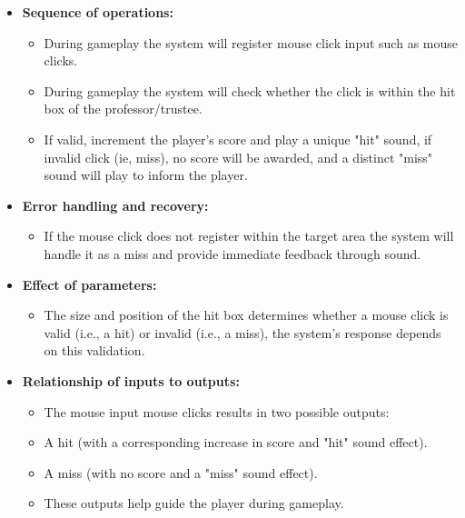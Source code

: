 \documentclass{article}
\begin{document}
\begin{itemize}
    \item \textbf{Sequence of operations:}
        \begin{itemize}
            \item During gameplay the system will register mouse click input such as mouse clicks.
            \item During gameplay the system will check whether the click is within the hit box of the professor/trustee.
            \item If valid, increment the player’s score and play a unique "hit" sound, if invalid click (ie, miss), no score will be awarded, and a distinct "miss" sound will play to inform the player.
        \end{itemize}
\end{itemize}

\begin{itemize}
    \item \textbf{Error handling and recovery:}
        \begin{itemize}
            \item If the mouse click does not register within the target area the system will handle it as a miss and provide immediate feedback through sound.
        \end{itemize}
\end{itemize}

\begin{itemize}
    \item \textbf{Effect of parameters:}
        \begin{itemize}
            \item The size and position of the hit box determines whether a mouse click is valid (i.e., a hit) or invalid (i.e., a miss), the system’s response depends on this validation.
        \end{itemize}
\end{itemize}

\begin{itemize}
    \item \textbf{Relationship of inputs to outputs:}
        \begin{itemize}
            \item The mouse input mouse clicks results in two possible outputs:
            \item A hit (with a corresponding increase in score and "hit" sound effect).
            \item A miss (with no score and a "miss" sound effect).
            \item These outputs help guide the player during gameplay.
        \end{itemize}
\end{itemize}
\end{document}
